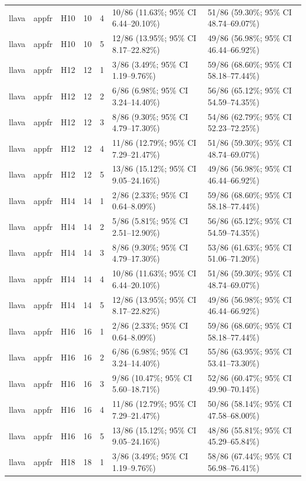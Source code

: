 \begin{longtable}{lllrrll}
llava & appfr & H10 & 10 & 4 & 10/86 (11.63\%; 95\% CI 6.44–20.10\%) & 51/86 (59.30\%; 95\% CI 48.74–69.07\%) \\
llava & appfr & H10 & 10 & 5 & 12/86 (13.95\%; 95\% CI 8.17–22.82\%) & 49/86 (56.98\%; 95\% CI 46.44–66.92\%) \\
llava & appfr & H12 & 12 & 1 & 3/86 (3.49\%; 95\% CI 1.19–9.76\%) & 59/86 (68.60\%; 95\% CI 58.18–77.44\%) \\
llava & appfr & H12 & 12 & 2 & 6/86 (6.98\%; 95\% CI 3.24–14.40\%) & 56/86 (65.12\%; 95\% CI 54.59–74.35\%) \\
llava & appfr & H12 & 12 & 3 & 8/86 (9.30\%; 95\% CI 4.79–17.30\%) & 54/86 (62.79\%; 95\% CI 52.23–72.25\%) \\
llava & appfr & H12 & 12 & 4 & 11/86 (12.79\%; 95\% CI 7.29–21.47\%) & 51/86 (59.30\%; 95\% CI 48.74–69.07\%) \\
llava & appfr & H12 & 12 & 5 & 13/86 (15.12\%; 95\% CI 9.05–24.16\%) & 49/86 (56.98\%; 95\% CI 46.44–66.92\%) \\
llava & appfr & H14 & 14 & 1 & 2/86 (2.33\%; 95\% CI 0.64–8.09\%) & 59/86 (68.60\%; 95\% CI 58.18–77.44\%) \\
llava & appfr & H14 & 14 & 2 & 5/86 (5.81\%; 95\% CI 2.51–12.90\%) & 56/86 (65.12\%; 95\% CI 54.59–74.35\%) \\
llava & appfr & H14 & 14 & 3 & 8/86 (9.30\%; 95\% CI 4.79–17.30\%) & 53/86 (61.63\%; 95\% CI 51.06–71.20\%) \\
llava & appfr & H14 & 14 & 4 & 10/86 (11.63\%; 95\% CI 6.44–20.10\%) & 51/86 (59.30\%; 95\% CI 48.74–69.07\%) \\
llava & appfr & H14 & 14 & 5 & 12/86 (13.95\%; 95\% CI 8.17–22.82\%) & 49/86 (56.98\%; 95\% CI 46.44–66.92\%) \\
llava & appfr & H16 & 16 & 1 & 2/86 (2.33\%; 95\% CI 0.64–8.09\%) & 59/86 (68.60\%; 95\% CI 58.18–77.44\%) \\
llava & appfr & H16 & 16 & 2 & 6/86 (6.98\%; 95\% CI 3.24–14.40\%) & 55/86 (63.95\%; 95\% CI 53.41–73.30\%) \\
llava & appfr & H16 & 16 & 3 & 9/86 (10.47\%; 95\% CI 5.60–18.71\%) & 52/86 (60.47\%; 95\% CI 49.90–70.14\%) \\
llava & appfr & H16 & 16 & 4 & 11/86 (12.79\%; 95\% CI 7.29–21.47\%) & 50/86 (58.14\%; 95\% CI 47.58–68.00\%) \\
llava & appfr & H16 & 16 & 5 & 13/86 (15.12\%; 95\% CI 9.05–24.16\%) & 48/86 (55.81\%; 95\% CI 45.29–65.84\%) \\
llava & appfr & H18 & 18 & 1 & 3/86 (3.49\%; 95\% CI 1.19–9.76\%) & 58/86 (67.44\%; 95\% CI 56.98–76.41\%) \\

\end{longtable}
